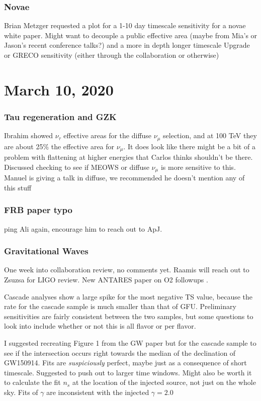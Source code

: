 \subsection*{\textbf{Novae}}
Brian Metzger requested a plot for a 1-10 day timescale sensitivity for a novae white paper. Might want to decouple a public effective area (maybe from Mia's or Jason's recent conference talks?) and a more in depth longer timescale Upgrade or GRECO sensitivity (either through the collaboration or otherwise)

\chapter{March 10, 2020}

\subsection*{\textbf{Tau regeneration and GZK}}
Ibrahim showed $\nu_{\tau}$ effective areas for the diffuse $\nu_{\mu}$ selection, and at 100 TeV they are about 25\% the effective area for $\nu_{\mu}$. It does look like there might be a bit of a problem with flattening at higher energies that Carlos thinks shouldn't be there. Discussed checking to see if MEOWS or diffuse $\nu_{\mu}$ is more sensitive to this. Manuel is giving a talk in diffuse, we recommended he doesn't mention any of this stuff

\subsection*{\textbf{FRB paper typo}}
ping Ali again, encourage him to reach out to ApJ.

\subsection*{\textbf{Gravitational Waves}}
One week into collaboration review, no comments yet. Raamis will reach out to Zsuzsa for LIGO review. New ANTARES paper on O2 followups \cite{Molla:2020wsw}.

Cascade analyses show a large spike for the most negative TS value, because the rate for the cascade sample is much smaller than that of GFU. Preliminary sensitivities are fairly consistent between the two samples, but some questions to look into include whether or not this is all flavor or per flavor.

I suggested recreating Figure 1 from the GW paper but for the cascade sample to see if the intersection occurs right towards the median of the declination of GW150914. Fits are \textit{suspiciously} perfect, maybe just as a consequence of short timescale. Suggested to push out to larger time windows. Might also be worth it to calculate the fit $n_s$ at the location of the injected source, not just on the whole sky. Fits of $\gamma$ are inconsistent with the injected $\gamma=2.0$

